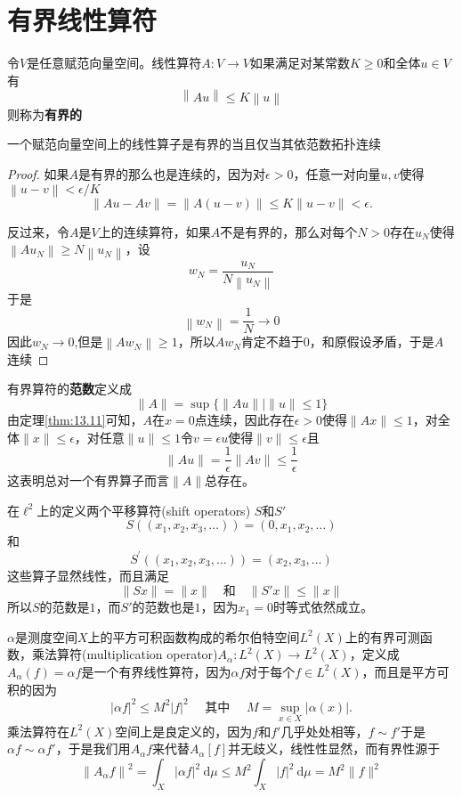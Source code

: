 \section{有界线性算符}
令\(V\)是任意赋范向量空间。线性算符\(A:V\rightarrow V\)如果满足对某常数\(K\geq 0\)和全体\(u\in V\)有
\[\left\lVert Au\right\rVert\leq K\left\lVert u\right\rVert  \]
则称为\textbf{有界的}
\begin{theorem}\label{thm:13.11}
    一个赋范向量空间上的线性算子是有界的当且仅当其依范数拓扑连续
\end{theorem}
\begin{proof}
    如果\(A\)是有界的那么也是连续的，因为对\(\epsilon>0\)，任意一对向量\(u,v\)使得\(\left\lVert u-v\right\rVert <\epsilon/K\)
    $$
\|A u-A v\|=\|A(u-v)\| \leq K\|u-v\|<\epsilon .
$$

反过来，令\(A\)是\(V\)上的连续算符，如果\(A\)不是有界的，那么对每个\(N>0\)存在\(u_N\)使得\(\left\lVert A u_N\right\rVert \geq N\left\lVert u_N\right\rVert \)，设
\[ w_{N}=\frac{u_{N}}{N\left\|u_{N}\right\|} \]
于是
\[\left\|w_{N}\right\|=\frac{1}{N} \rightarrow 0\]
因此\(w_N\rightarrow 0\),但是\(\left\lVert Aw_N\right\rVert\geq 1 \)，所以\(Aw_N\)肯定不趋于\(0\)，和原假设矛盾，于是\(A\)连续
\end{proof}
有界算符的\textbf{范数}定义成
$$
\|A\|=\sup \{\|A u\| \mid\|u\| \leq 1\}
$$
由定理\ref{thm:13.11}可知，\(A\)在\(x=0\)点连续，因此存在\(\epsilon>0\)使得\(\|Ax\|\leq 1\)，对全体\(\|x\|\leq \epsilon\)，对任意\(\|u\|\leq 1\)令\(v=\epsilon u\)使得\(\|v\|\leq \epsilon\)且
$$
\|A u\|=\frac{1}{\epsilon}\|A v\| \leq \frac{1}{\epsilon}
$$
这表明总对一个有界算子而言\(\|A\|\)总存在。
\begin{eg}\label{eg:13.8}
    在\(\ell^2\)上的定义两个平移算符(shift operators) \(S\)和\(S'\)
    \[S\left(\left(x_{1}, x_{2}, x_{3}, \ldots\right)\right)=\left(0, x_{1}, x_{2}, \ldots\right) \]
    和
    \[S^{\prime}\left(\left(x_{1}, x_{2}, x_{3}, \ldots\right)\right)=\left(x_{2}, x_{3}, \ldots\right) \]
    这些算子显然线性，而且满足
    \[\|Sx\|=\|x\|\quad \text{和}\quad \|S'x\|\leq \|x\|\]
    所以\(S\)的范数是\(1\)，而\(S'\)的范数也是\(1\)，因为\(x_1=0\)时等式依然成立。
\end{eg}
\begin{eg}\label{eg:13.9}
    \(\alpha\)是测度空间\(X\)上的平方可积函数构成的希尔伯特空间\(L^2(X)\)上的有界可测函数，乘法算符(multiplication operator)\(A_\alpha:L^2(X)\rightarrow L^2(X)\)，定义成\(A_\alpha (f)=\alpha f\)是一个有界线性算符，因为\(\alpha f\)对于每个\(f\in L^2(X)\)，而且是平方可积的因为
$$
|\alpha f|^{2} \leq M^{2}|f|^{2} \quad \text { 其中 } \quad M=\sup _{x \in X}|\alpha(x)| .
$$
乘法算符在\(L^2(X)\)空间上是良定义的，因为\(f\)和\(f'\)几乎处处相等，\(f\sim f'\)于是\(\alpha f\sim \alpha f'\)，于是我们用\(A_\alpha f\)来代替\(A_\alpha [f]\)并无歧义，线性性显然，而有界性源于
$$
\left\|A_{\alpha} f\right\|^{2}=\int_{X}|\alpha f|^{2} \mathrm{~d} \mu \leq M^{2} \int_{X}|f|^{2} \mathrm{~d} \mu=M^{2}\|f\|^{2}
$$
\end{eg}
